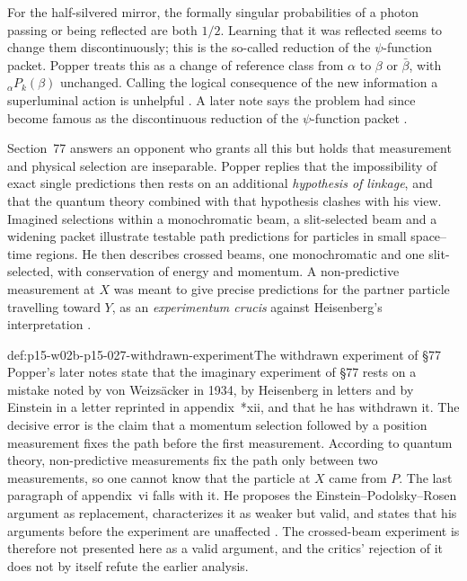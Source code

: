 For the half-silvered mirror, the formally singular probabilities of a
photon passing or being reflected are both \(1/2\). Learning that it was
reflected seems to change them discontinuously; this is the so-called
reduction of the \(\psi\)-function packet. Popper treats this as a change of reference class from
\(\alpha\) to \(\beta\) or \(\bar\beta\), with \({}_{\alpha}P_k(\beta)\)
unchanged. Calling the logical consequence of the new information a
superluminal action is unhelpful \parencite[\S76 and note~*5]{Popper2002LogicDiscoveryUI}.
A later note says the problem had since become famous as the
discontinuous reduction of the \(\psi\)-function packet \parencite[\S76, note~*4]{Popper2002LogicDiscoveryUI}.

Section~77 answers an opponent who grants all this but holds that
measurement and physical selection are inseparable. Popper replies that
the impossibility of exact single predictions then rests on an
additional \emph{hypothesis of linkage}, and that the quantum theory
combined with that hypothesis clashes with his view. Imagined selections
within a monochromatic beam, a slit-selected beam and a widening
packet illustrate testable path predictions for particles in small
space--time regions. He then describes crossed beams, one monochromatic
and one slit-selected, with conservation of energy and momentum. A
non-predictive measurement at \(X\) was meant to give precise predictions
for the partner particle travelling toward \(Y\), as an \emph{experimentum
crucis} against Heisenberg's interpretation
\parencite[\S77]{Popper2002LogicDiscoveryUI}.

\begin{hbwarning}{def:p15-w02b-p15-027-withdrawn-experiment}{The withdrawn experiment of \S77}
Popper's later notes state that the imaginary experiment of \S77 rests
on a mistake noted by von Weizsäcker in 1934, by Heisenberg in letters
and by Einstein in a letter reprinted in appendix~*xii, and that he has
withdrawn it. The decisive error is the claim that a momentum selection
followed by a position measurement fixes the path before the first
measurement. According to quantum theory, non-predictive measurements
fix the path only between two measurements, so one cannot know that the
particle at \(X\) came from \(P\). The last paragraph of appendix~vi
falls with it. He proposes the Einstein--Podolsky--Rosen argument as
replacement, characterizes it as weaker but valid, and states that his
arguments before the experiment are unaffected
\parencite[\S77, notes~**, *2--*4]{Popper2002LogicDiscoveryUI}.
The crossed-beam experiment is therefore not presented here as a valid
argument, and the critics' rejection of it does not by itself refute
the earlier analysis.
\end{hbwarning}

